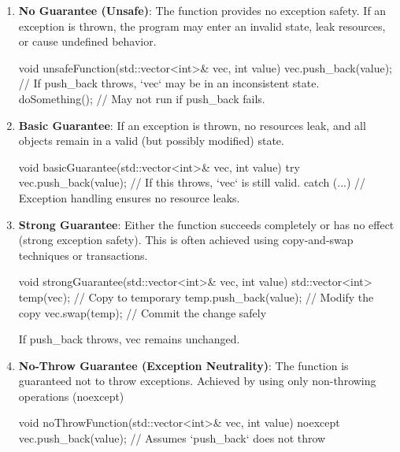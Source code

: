 \documentclass{report}
\begin{document}
\begin{enumerate}
    \item \textbf{No Guarantee (Unsafe)}: The function provides no exception safety. If an exception is thrown, the program may enter an invalid state, leak resources, or cause undefined behavior.
        \bigbreak \noindent 
        \begin{cppcode}
            void unsafeFunction(std::vector<int>& vec, int value) {
                vec.push_back(value); // If push_back throws, `vec` may be in an inconsistent state.
                doSomething(); // May not run if push_back fails.
            }
        \end{cppcode}
    \item \textbf{Basic Guarantee}: If an exception is thrown, no resources leak, and all objects remain in a valid (but possibly modified) state.
        \bigbreak \noindent 
        \begin{cppcode}
            void basicGuarantee(std::vector<int>& vec, int value) {
                try {
                    vec.push_back(value); // If this throws, `vec` is still valid.
                } catch (...) {
                    // Exception handling ensures no resource leaks.
                }
            }
        \end{cppcode}
    \item \textbf{Strong Guarantee}: Either the function succeeds completely or has no effect (strong exception safety). This is often achieved using copy-and-swap techniques or transactions.
        \bigbreak \noindent 
        \begin{cppcode}
            void strongGuarantee(std::vector<int>& vec, int value) {
                std::vector<int> temp(vec); // Copy to temporary
                temp.push_back(value); // Modify the copy
                vec.swap(temp); // Commit the change safely
            }
        \end{cppcode}
        \bigbreak \noindent 
        If push\_back throws, vec remains unchanged.
    \item \textbf{No-Throw Guarantee (Exception Neutrality)}: The function is guaranteed not to throw exceptions. Achieved by using only non-throwing operations (noexcept)
        \bigbreak \noindent 
        \begin{cppcode}
            void noThrowFunction(std::vector<int>& vec, int value) noexcept {
                vec.push_back(value); // Assumes `push_back` does not throw
            }
        \end{cppcode}
\end{enumerate}
\end{document}
